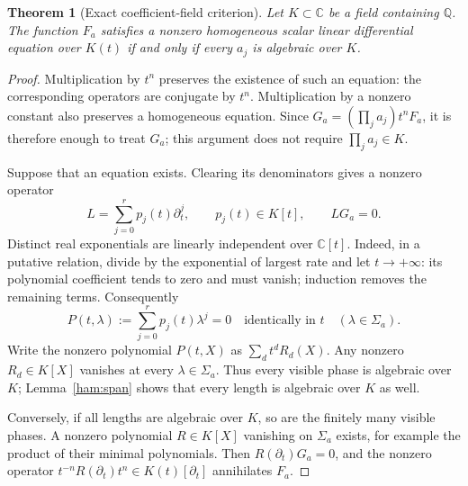\documentclass[11pt]{article}
\newtheorem{theorem}{Theorem}[section]
\theoremstyle{definition}
\theoremstyle{remark}
\begin{document}
\begin{theorem}[Exact coefficient-field criterion]\label{ham:field}
Let $K\subset\mathbb C$ be a field containing $\mathbb Q$.  The function
$F_a$ satisfies a nonzero homogeneous scalar linear differential equation
over $K(t)$ if and only if every $a_j$ is algebraic over $K$.
\end{theorem}
\begin{proof}
Multiplication by $t^n$ preserves the existence of such an equation:
the corresponding operators are conjugate by $t^n$.  Multiplication by a
nonzero constant also preserves a homogeneous equation.  Since
$G_a=(\prod_j a_j)t^nF_a$, it is therefore enough to treat $G_a$; this
argument does not require $\prod_j a_j\in K$.

Suppose that an equation exists.  Clearing its denominators gives a
nonzero operator
\[
 L=\sum_{j=0}^r p_j(t)\partial_t^j,\qquad p_j(t)\in K[t],
 \qquad LG_a=0.
\]
Distinct real exponentials are linearly independent over $\mathbb C[t]$.
Indeed, in a putative relation, divide by the exponential of largest
rate and let $t\to+\infty$: its polynomial coefficient tends to zero
and must vanish; induction removes the remaining terms.  Consequently
\[
 P(t,\lambda):=\sum_{j=0}^r p_j(t)\lambda^j=0
 \quad\text{identically in }t\quad(\lambda\in\Sigma_a).
\]
Write the nonzero polynomial $P(t,X)$ as $\sum_d t^dR_d(X)$.
Any nonzero $R_d\in K[X]$ vanishes at every $\lambda\in\Sigma_a$.
Thus every visible phase is algebraic over $K$; Lemma~\ref{ham:span}
shows that every length is algebraic over $K$ as well.

Conversely, if all lengths are algebraic over $K$, so are the finitely
many visible phases.  A nonzero polynomial $R\in K[X]$ vanishing on
$\Sigma_a$ exists, for example the product of their minimal polynomials.
Then $R(\partial_t)G_a=0$, and the nonzero operator
$t^{-n}R(\partial_t)t^n\in K(t)[\partial_t]$ annihilates $F_a$.
\end{proof}
\end{document}
